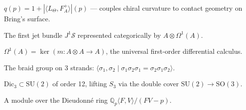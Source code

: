 \begin{definition}
  \label{def:substrate-parameter}
  $q(p) = 1 + |\langle L_\varTheta, F_A^+\rangle|(p)$ --- couples
  chiral curvature to contact geometry on Bring's surface.
\end{definition}

\begin{definition}
  \label{def:jet-prolongation}
  The first jet bundle $J^1 \mathcal{S}$ represented categorically by
  $A \otimes \Omega^1(A)$.
\end{definition}

\begin{definition}
  \label{def:kahler-differentials}
  $\Omega^1(A) = \ker(m : A \otimes A \to A)$, the universal
  first-order differential calculus.
\end{definition}

\begin{definition}
  \label{def:braid-group}
  The braid group on 3 strands: $\langle \sigma_1, \sigma_2 \mid
  \sigma_1\sigma_2\sigma_1 = \sigma_2\sigma_1\sigma_2 \rangle$.
\end{definition}

\begin{definition}
  \label{def:binary-dihedral}
  $\mathrm{Dic}_3 \subset \mathrm{SU}(2)$ of order 12, lifting $S_3$
  via the double cover $\mathrm{SU}(2) \to \mathrm{SO}(3)$.
\end{definition}

\begin{definition}[F-Isocrystal]
  \label{def:f-isocrystal}
  A module over the Dieudonné ring $\mathbb{Q}_p\langle F, V\rangle
  / (FV - p)$.
\end{definition}


